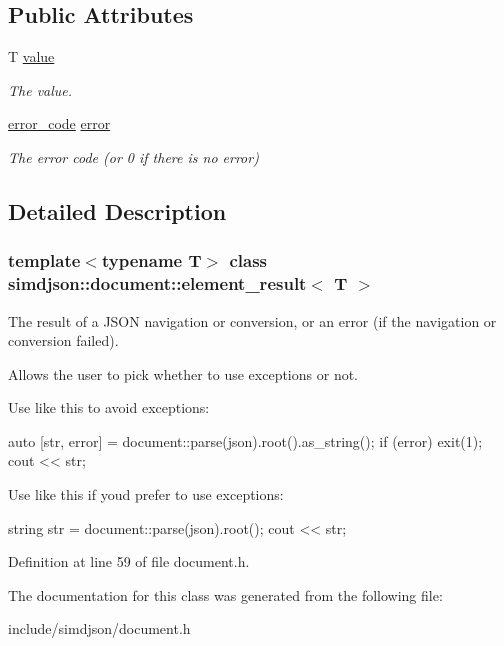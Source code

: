 \subsection*{Public Attributes}
\begin{DoxyCompactItemize}
\item 
\mbox{\label{classsimdjson_1_1document_1_1element__result_a94226d9047322a2a469742b8953ceac5}} 
T \hyperlink{classsimdjson_1_1document_1_1element__result_a94226d9047322a2a469742b8953ceac5}{value}
\begin{DoxyCompactList}\small\item\em The value. \end{DoxyCompactList}\item 
\mbox{\label{classsimdjson_1_1document_1_1element__result_a4a4b9dfade427211439815fa0940e529}} 
\hyperlink{namespacesimdjson_a7b735a3a50ba79e3f7f14df5f77d8da9}{error\+\_\+code} \hyperlink{classsimdjson_1_1document_1_1element__result_a4a4b9dfade427211439815fa0940e529}{error}
\begin{DoxyCompactList}\small\item\em The error code (or 0 if there is no error) \end{DoxyCompactList}\end{DoxyCompactItemize}


\subsection{Detailed Description}
\subsubsection*{template$<$typename T$>$\newline
class simdjson\+::document\+::element\+\_\+result$<$ T $>$}

The result of a J\+S\+ON navigation or conversion, or an error (if the navigation or conversion failed). 

Allows the user to pick whether to use exceptions or not.

Use like this to avoid exceptions\+: \begin{DoxyVerb}auto [str, error] = document::parse(json).root().as_string();
if (error) { exit(1); }
cout << str;
\end{DoxyVerb}


Use like this if you\textquotesingle{}d prefer to use exceptions\+: \begin{DoxyVerb}string str = document::parse(json).root();
cout << str;\end{DoxyVerb}
 

Definition at line 59 of file document.\+h.



The documentation for this class was generated from the following file\+:\begin{DoxyCompactItemize}
\item 
include/simdjson/document.\+h\end{DoxyCompactItemize}
